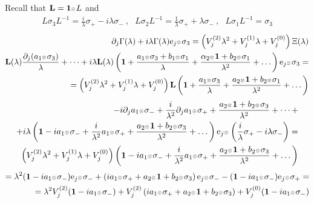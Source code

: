 \documentclass{article}
\def\L{{\mathbf L}}
\def\ot{\hbox{\resizebox{6pt}{!}{$ \otimes \,
$}}}
\def\s{\sigma}
\def\1{\mathbf 1}
\def\a{{\alpha}}
\def \pa{\partial}
\newcommand{\be}{\begin{eqnarray}}
\newcommand{\ee}{\end{eqnarray}}
\def\le{\left}
\def\ri{\right}
\begin{document}
Recall that $\L = \1 \ot L$ and 
\be
L\s_3 L^{-1}= \frac i \lambda \s_+ -i \lambda \s_-\ ,\ \ \ 
L \s_2 L^{-1} = \frac 1  \lambda \s_+ + \lambda \s_-\ ,\ \ \ 
L\s_1 L^{-1}= \s_3 
\ee
\be
\pa_j \Gamma(\lambda) + i \lambda  \Gamma(\lambda) {\mathrm e}_{j} \ot  \s_3 = \le(V^{(2)}_j \lambda^2 +V^{(1)}_j \lambda+ V^{(0)}_j \ri) \Xi(\lambda )\nonumber \\
\L(\lambda) \frac {\pa_j(a_1\ot \s_3 ) }\lambda  +\dots  + i \lambda  \L (\lambda) \le(\1 + \frac {a_1\ot \s_3 + b_1\ot \s_1 }\lambda + \frac {\a_2\ot \1 + b_2\ot \s_1}{\lambda^2}+\dots \ri){\mathrm e}_{j}\ot \s_3 =\nonumber \\=
 \le(V^{(2)}_j \lambda^2 +V_j^{(1)} \lambda + V_j^{(0)} \ri)\L\le(\1 + \frac {a_1\ot \s_3 }\lambda + \frac {a_2\ot \1 + b_2\ot \s_1}{\lambda^2}+\dots \ri)\label{917}
\ee 
\be
-i\pa_j a_1\ot\s_-  + \frac i {\lambda ^2} \pa_j a_1\ot \s_+  + \frac {a_2 \ot \1 + b_2\ot \s_3}{\lambda^2} +\dots  +\\
+ i \lambda   \le(\1 - i a_1\ot \s_- + \frac i{\lambda^2} a_1\ot \s_+ +  \frac {a_2\ot \1 + b_2\ot \s_3}{\lambda^2}+\dots \ri){\mathrm e}_{j}\ot \le(\frac i \lambda \s_+ - i \lambda\s_-\ri) =
\nonumber \\
 \le(V^{(2)}_j \lambda^2 +V_j^{(1)} \lambda + V_j^{(0)} \ri)
  \le(\1 - i a_1\ot \s_- + \frac i{\lambda^2} a_1\ot \s_+ +  \frac {a_2\ot \1 + b_2\ot \s_3}{\lambda^2}+\dots \ri)
\ee 
\be
= \lambda^2(\1 - ia_1\ot \s_-)  {\mathrm e}_{j}\ot \s_-  + \le(ia_1\ot \s_+ + a_2\ot \1 + b_2 \ot \s_3 \ri) {\mathrm e}_{j}\ot \s_- 
-(\1-ia_1\ot \s_-) {\mathrm e}_{j}\ot \s_+
\nonumber =\\
=\lambda^2 V^{(2)}_j (\1 - ia_1\ot \s_-) + V_j^{(2)} \le( i a_1\ot \s_+ + a_2 \ot \1 + b_2\ot \s_3 \ri) + V_j^{(0)} (\1 - ia_1\ot \s_-)
\ee
\end{document}
